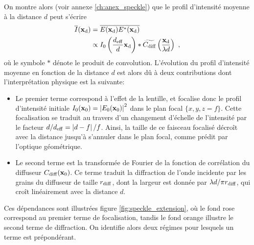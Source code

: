 On montre alors (voir annexe \ref{ch:anex_speckle}) que le profil d'intensité moyenne à la distance $d$ peut s'écrire \citep{gatti2008three}
\begin{align}
\nonumber\overline{I}(\mathbf{x}_{\mathrm{d}})&=\overline{E(\mathbf{x}_{\mathrm{d}}) E^*(\mathbf{x}_{\mathrm{d}})} \\
&\propto I_0 \left( \frac{d_{\mathrm{eff}}}{d} \mathbf{x}_{\mathrm{d}} \right) \ast \widetilde{C_{\mathrm{diff}}}\left( \frac{\mathbf{x}_{\mathrm{d}}}{\lambda d} \right) \text{ ,}
\label{eq:evolution_extension_transverse_speckle}
\end{align}
où le symbole $\ast$ dénote le produit de convolution. L'évolution du profil d'intensité moyenne en fonction de la distance $d$ est alors dû à deux contributions dont l'interprétation physique est la suivante:
\begin{itemize}
\item[\textendash] Le premier terme correspond à l'effet de la lentille, et focalise donc le profil d'intensité initiale $I_0(\mathbf{x}_0)=\left| E_0(\mathbf{x}_0) \right|^2$ dans le plan focal $\lbrace x,y,z=f\rbrace$. Cette focalisation se traduit au travers d'un changement d'échelle de l'intensité par le facteur $d/d_{\mathrm{eff}}=\left| d-f \right| /f$. Ainsi, la taille de ce faisceau focalisé décroît avec la distance jusqu'à s'annuler dans le plan focal, comme prédit par l'optique géométrique.
\item[\textendash] Le second terme est la transformée de Fourier de la fonction de corrélation du diffuseur $C_{\mathrm{diff}}(\mathbf{x}_0)$. Ce terme traduit la diffraction de l'onde incidente par les grains du diffuseur de taille $r_{\mathrm{diff}}$, dont la largeur est donnée par $\lambda d/ \pi r_{\mathrm{diff}}$, qui croît linéairement avec la distance $d$.
\end{itemize}
Ces dépendances sont illustrées figure \ref{fig:speckle_extension}, où le fond rose correspond au premier terme de focalisation, tandis le fond orange illustre le second terme de diffraction. On identifie alors deux régimes pour lesquels un terme est prépondérant. 

